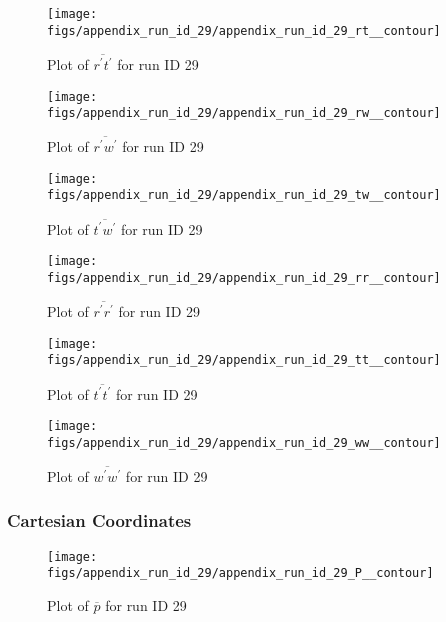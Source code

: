 \begin{figure}[H]
\centering
\texttt{[image: figs/appendix\_run\_id\_29/appendix\_run\_id\_29\_rt\_\_contour]}
\caption{Plot of $\overline{r^\prime t^\prime}$ for run ID 29}
\label{fig:appendix_run_id_29_rt__contour}
\end{figure}


\begin{figure}[H]
\centering
\texttt{[image: figs/appendix\_run\_id\_29/appendix\_run\_id\_29\_rw\_\_contour]}
\caption{Plot of $\overline{r^\prime w^\prime}$ for run ID 29}
\label{fig:appendix_run_id_29_rw__contour}
\end{figure}


\begin{figure}[H]
\centering
\texttt{[image: figs/appendix\_run\_id\_29/appendix\_run\_id\_29\_tw\_\_contour]}
\caption{Plot of $\overline{t^\prime w^\prime}$ for run ID 29}
\label{fig:appendix_run_id_29_tw__contour}
\end{figure}


\begin{figure}[H]
\centering
\texttt{[image: figs/appendix\_run\_id\_29/appendix\_run\_id\_29\_rr\_\_contour]}
\caption{Plot of $\overline{r^\prime r^\prime}$ for run ID 29}
\label{fig:appendix_run_id_29_rr__contour}
\end{figure}


\begin{figure}[H]
\centering
\texttt{[image: figs/appendix\_run\_id\_29/appendix\_run\_id\_29\_tt\_\_contour]}
\caption{Plot of $\overline{t^\prime t^\prime}$ for run ID 29}
\label{fig:appendix_run_id_29_tt__contour}
\end{figure}


\begin{figure}[H]
\centering
\texttt{[image: figs/appendix\_run\_id\_29/appendix\_run\_id\_29\_ww\_\_contour]}
\caption{Plot of $\overline{w^\prime w^\prime}$ for run ID 29}
\label{fig:appendix_run_id_29_ww__contour}
\end{figure}


\subsubsection{Cartesian Coordinates}
\begin{figure}[H]
\centering
\texttt{[image: figs/appendix\_run\_id\_29/appendix\_run\_id\_29\_P\_\_contour]}
\caption{Plot of $\overline{p}$ for run ID 29}
\label{fig:appendix_run_id_29_P__contour}
\end{figure}


